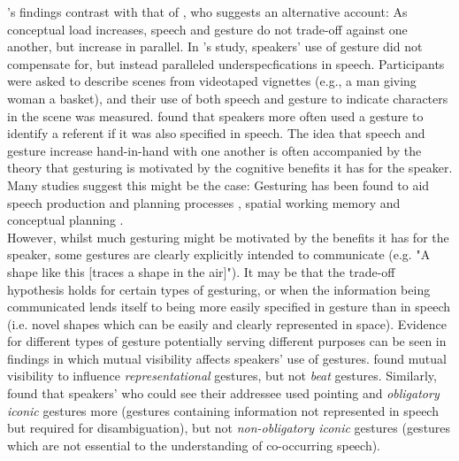 \documentclass[a4paper,man,natbib]{apa6}
\newcommand*{\term}[1]{\emph{#1}} %
\begin{document}
\citeauthor{Melinger2004}'s findings contrast with that of \citep{So2009}, who suggests an alternative account:
As conceptual load increases, speech and gesture do not trade-off against one another, but increase in parallel.
In \citeauthor{So2009}'s study, speakers' use of gesture did not compensate for, but instead paralleled underspecfications in speech.
Participants were asked to describe scenes from videotaped vignettes (e.g., a man giving woman a basket), and their use of both speech and gesture to indicate characters in the scene was measured.
\citeauthor{So2009} found that speakers more often used a gesture to identify a referent if it was also specified in speech. 
The idea that speech and gesture increase hand-in-hand with one another is often accompanied by the theory that gesturing is motivated by the cognitive benefits it has for the speaker. 
Many studies suggest this might be the case: Gesturing has been found to aid speech production and planning processes \citep{Rauscher1996, Krauss1999, Rose2001, Morsella2004, Kita2000}, spatial working memory \citep{Wesp2001, Morsella2004} and conceptual planning \citep{Melinger2007}.\\

However, whilst much gesturing might be motivated by the benefits it has for the speaker, some gestures are clearly explicitly intended to communicate (e.g. "A shape like this [traces a shape in the air]"). It may be that the trade-off hypothesis holds for certain types of gesturing, or when the information being communicated lends itself to being more easily specified in gesture than in speech (i.e. novel shapes which can be easily and clearly represented in space).
Evidence for different types of gesture potentially serving different purposes can be seen in findings in which mutual visibility affects speakers' use of gestures.
\citet{Alibali2001} found mutual visibility to influence \term{representational} gestures, but not \term{beat} gestures. 
Similarly, \citet{DeRuiter2012} found that speakers' who could see their addressee used pointing and \term{obligatory iconic} gestures more (gestures containing information not represented in speech but required for disambiguation), but not \term{non-obligatory iconic} gestures (gestures which are not essential to the understanding of co-occurring speech).\\
\end{document}
